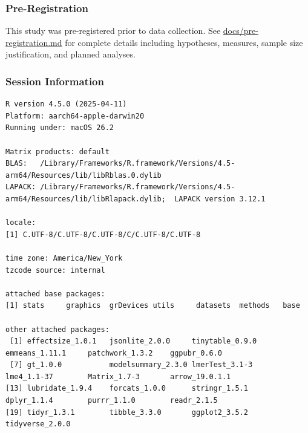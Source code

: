 \documentclass[
  11pt,
  oneside]{article}
\begin{document}
\subsubsection{Pre-Registration}\label{pre-registration}

This study was pre-registered prior to data collection. See
\href{../docs/pre-registration.md}{docs/pre-registration.md} for
complete details including hypotheses, measures, sample size
justification, and planned analyses.

\subsubsection{Session Information}\label{session-information}

\begin{verbatim}
R version 4.5.0 (2025-04-11)
Platform: aarch64-apple-darwin20
Running under: macOS 26.2

Matrix products: default
BLAS:   /Library/Frameworks/R.framework/Versions/4.5-arm64/Resources/lib/libRblas.0.dylib 
LAPACK: /Library/Frameworks/R.framework/Versions/4.5-arm64/Resources/lib/libRlapack.dylib;  LAPACK version 3.12.1

locale:
[1] C.UTF-8/C.UTF-8/C.UTF-8/C/C.UTF-8/C.UTF-8

time zone: America/New_York
tzcode source: internal

attached base packages:
[1] stats     graphics  grDevices utils     datasets  methods   base     

other attached packages:
 [1] effectsize_1.0.1   jsonlite_2.0.0     tinytable_0.9.0    emmeans_1.11.1     patchwork_1.3.2    ggpubr_0.6.0      
 [7] gt_1.0.0           modelsummary_2.3.0 lmerTest_3.1-3     lme4_1.1-37        Matrix_1.7-3       arrow_19.0.1.1    
[13] lubridate_1.9.4    forcats_1.0.0      stringr_1.5.1      dplyr_1.1.4        purrr_1.1.0        readr_2.1.5       
[19] tidyr_1.3.1        tibble_3.3.0       ggplot2_3.5.2      tidyverse_2.0.0   


\end{verbatim}
\end{document}
